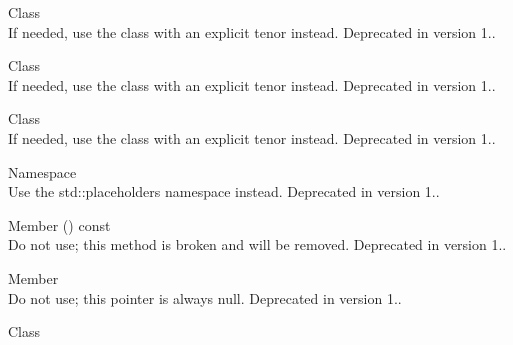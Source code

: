 \begin{DoxyRefList}
\item[Class \doxylink{class_quant_lib_1_1_e_u_r_libor8_m}{Quant\+Lib\+::EURLibor8M} ]\hfill \\
\label{deprecated__deprecated000082}%
%
If needed, use the  class with an explicit tenor instead. Deprecated in version 1..  
\item[Class \doxylink{class_quant_lib_1_1_e_u_r_libor9_m}{Quant\+Lib\+::EURLibor9M} ]\hfill \\
\label{deprecated__deprecated000083}%
%
If needed, use the  class with an explicit tenor instead. Deprecated in version 1..  
\item[Class \doxylink{class_quant_lib_1_1_e_u_r_libor_s_w}{Quant\+Lib\+::EURLibor\+SW} ]\hfill \\
\label{deprecated__deprecated000076}%
%
If needed, use the  class with an explicit tenor instead. Deprecated in version 1..  
\item[Namespace \doxylink{namespace_quant_lib_1_1ext_1_1placeholders}{Quant\+Lib\+::ext\+::placeholders} ]\hfill \\
\label{deprecated__deprecated000043}%
%
Use the std\+::placeholders namespace instead. Deprecated in version 1..  
\item[Member \doxylink{class_quant_lib_1_1_fixed_rate_bond_helper_a22f22d44f7042ac1745fffd4dbda3ece}{Quant\+Lib\+::Fixed\+Rate\+Bond\+Helper\+::fixed\+Rate\+Bond} () const]\hfill \\
\label{deprecated__deprecated000148}%
%
Do not use; this method is broken and will be removed. Deprecated in version 1..  
\item[Member \doxylink{class_quant_lib_1_1_fixed_rate_bond_helper_a3de2f80ff5ebb605131ac3b4f6a49122}{Quant\+Lib\+::Fixed\+Rate\+Bond\+Helper\+::fixed\+Rate\+Bond\+\_\+} ]\hfill \\
\label{deprecated__deprecated000149}%
%
Do not use; this pointer is always null. Deprecated in version 1..  
\item[Class \doxylink{class_quant_lib_1_1_generic_time_setter}{Quant\+Lib\+::Generic\+Time\+Setter\texorpdfstring{$<$}{<} Pde\+Class \texorpdfstring{$>$}{>}} ]\hfill \\

\end{DoxyRefList}
